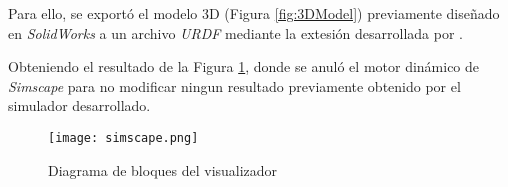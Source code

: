     Para ello, se exportó el modelo 3D (Figura \ref{fig:3DModel}) previamente diseñado en \emph{SolidWorks} a un archivo
    \emph{URDF} \cite{urdf} mediante la extesión desarrollada por \cite{sw2urdf}.

    Obteniendo el resultado de la Figura \ref{fig:visualizador}, donde se anuló el motor dinámico de 
    \emph{Simscape} para no modificar ningun resultado previamente obtenido por el simulador desarrollado. 
    \begin{figure}[H]
        \texttt{[image: simscape.png]}
        \centering
        \caption{Diagrama de bloques del visualizador}
        \label{fig:visualizador}
    \end{figure}
    
    